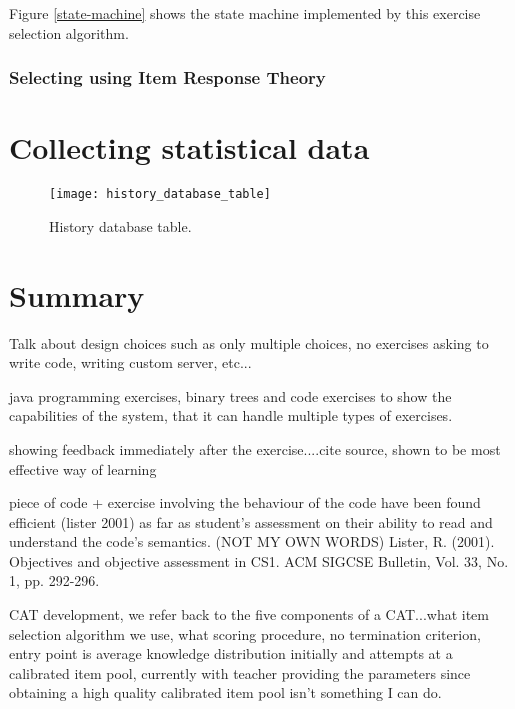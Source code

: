 Figure \ref{state-machine} shows the state machine implemented by this exercise selection algorithm.

\subsubsection{Selecting using Item Response Theory}





\section{Collecting statistical data}
\begin{figure}[H]
\centering
\texttt{[image: history\_database\_table]}
\caption{History database table.}
\label{fig:history_database_table}
\end{figure}

\section{Summary}

\newpage

Talk about design choices such as only multiple choices, no exercises asking to write code, writing custom server, etc...\newline

java programming exercises, binary trees and code exercises to show the capabilities of the system, that it can handle multiple types of exercises.\newline

showing feedback immediately after the exercise....cite source, shown to be most effective way of learning\newline

piece of code + exercise involving the behaviour of the code have been found efficient (lister 2001) as far as student's assessment on their ability to read and understand the code's semantics. (NOT MY OWN WORDS) Lister, R. (2001). Objectives and objective assessment in CS1. ACM SIGCSE Bulletin, Vol. 33, No. 1, pp. 292-296. \newline

CAT development, we refer back to the five components of a CAT...what item selection algorithm we use, what scoring procedure, no termination criterion, entry point is average knowledge distribution initially and attempts at a calibrated item pool, currently with teacher providing the parameters since obtaining a high quality calibrated item pool isn't something I can do.

